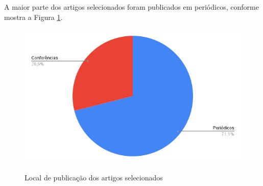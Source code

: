 \documentclass[
	12pt,				%
	oneside,			%
	a4paper,			%
	english,			%
	brazil				%
	]{abntex2ppgsi}
\begin{document}
\begin{apendicesenv}
A maior parte dos artigos selecionados foram publicados em periódicos, conforme mostra a Figura \ref{fig:local-de-publicação-do-artigo}.
\begin{figure}[htbp]
	\centering
	\caption{Local de publicação dos artigos selecionados}
		\includegraphics[width=\linewidth]{images/local-de-publicação-do-artigo.png}
	\label{fig:local-de-publicação-do-artigo}
\end{figure}

\end{apendicesenv}



\begin{anexosenv}


\end{anexosenv}

\end{document}
